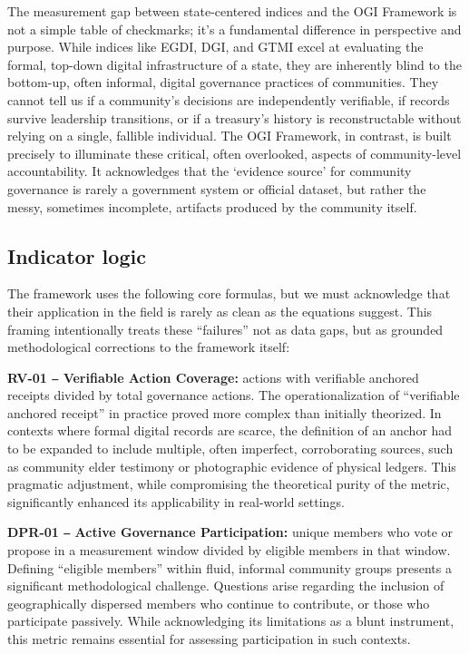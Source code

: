 \documentclass[sigconf,anonymous]{acmart}
\begin{document}
The measurement gap between state-centered indices and the OGI Framework is not a simple table of checkmarks; it’s a fundamental difference in perspective and purpose. While indices like EGDI, DGI, and GTMI excel at evaluating the formal, top-down digital infrastructure of a state, they are inherently blind to the bottom-up, often informal, digital governance practices of communities. They cannot tell us if a community’s decisions are independently verifiable, if records survive leadership transitions, or if a treasury’s history is reconstructable without relying on a single, fallible individual. The OGI Framework, in contrast, is built precisely to illuminate these critical, often overlooked, aspects of community-level accountability. It acknowledges that the ‘evidence source’ for community governance is rarely a government system or official dataset, but rather the messy, sometimes incomplete, artifacts produced by the community itself.

\subsection{Indicator logic}

The framework uses the following core formulas, but we must acknowledge that their application in the field is rarely as clean as the equations suggest. This framing intentionally treats these “failures” not as data gaps, but as grounded methodological corrections to the framework itself:

\textbf{RV-01 ‒ Verifiable Action Coverage:} actions with verifiable anchored receipts divided by total governance actions. The operationalization of “verifiable anchored receipt” in practice proved more complex than initially theorized. In contexts where formal digital records are scarce, the definition of an anchor had to be expanded to include multiple, often imperfect, corroborating sources, such as community elder testimony or photographic evidence of physical ledgers. This pragmatic adjustment, while compromising the theoretical purity of the metric, significantly enhanced its applicability in real-world settings.

\textbf{DPR-01 ‒ Active Governance Participation:} unique members who vote or propose in a measurement window divided by eligible members in that window. Defining “eligible members” within fluid, informal community groups presents a significant methodological challenge. Questions arise regarding the inclusion of geographically dispersed members who continue to contribute, or those who participate passively. While acknowledging its limitations as a blunt instrument, this metric remains essential for assessing participation in such contexts.
\end{document}
